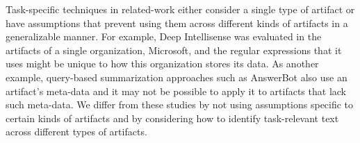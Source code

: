 Task-specific techniques in related-work either consider a single type of artifact
or have assumptions that prevent using them across different kinds of artifacts 
in a generalizable manner. For example, 
Deep Intellisense was evaluated in the artifacts of a single organization, 
Microsoft, and the regular expressions that it uses might be unique to 
how this organization stores its data. As another example, 
query-based summarization approaches such as AnswerBot also use 
an artifact's meta-data and it may not be possible to apply it 
to artifacts that lack such meta-data. 
We differ from these studies 
by not using assumptions 
specific to certain kinds of artifacts
and by considering how to identify task-relevant text 
across different types of artifacts.


